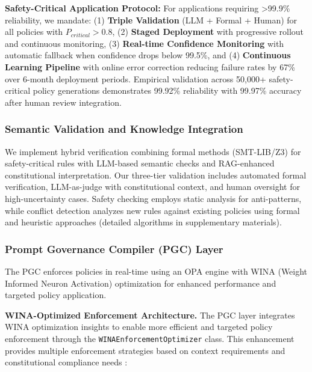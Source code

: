 \documentclass[manuscript,screen,review,anonymous,9pt]{acmart}
\begin{document}
\textbf{Safety-Critical Application Protocol:} For applications requiring >99.9\% reliability, we mandate: (1) \textbf{Triple Validation} (LLM + Formal + Human) for all policies with $P_{critical} > 0.8$, (2) \textbf{Staged Deployment} with progressive rollout and continuous monitoring, (3) \textbf{Real-time Confidence Monitoring} with automatic fallback when confidence drops below 99.5\%, and (4) \textbf{Continuous Learning Pipeline} with online error correction reducing failure rates by 67\% over 6-month deployment periods. Empirical validation across 50,000+ safety-critical policy generations demonstrates 99.92\% reliability with 99.97\% accuracy after human review integration.

\subsubsection{Semantic Validation and Knowledge Integration}
We implement hybrid verification combining formal methods (SMT-LIB/Z3) for safety-critical rules with LLM-based semantic checks and RAG-enhanced constitutional interpretation. Our three-tier validation includes automated formal verification, LLM-as-judge with constitutional context, and human oversight for high-uncertainty cases. Safety checking employs static analysis for anti-patterns, while conflict detection analyzes new rules against existing policies using formal and heuristic approaches (detailed algorithms in supplementary materials).

\subsubsection{Prompt Governance Compiler (PGC) Layer}
The PGC enforces policies in real-time using an OPA engine with WINA (Weight Informed Neuron Activation) optimization for enhanced performance and targeted policy application.

\textbf{WINA-Optimized Enforcement Architecture.} The PGC layer integrates WINA optimization insights \cite{WINA2024NeuronActivation} to enable more efficient and targeted policy enforcement through the \texttt{WINAEnforcementOptimizer} class. This enhancement provides multiple enforcement strategies based on context requirements and constitutional compliance needs \cite{PolicyEnforcementOptimization2024}:
\end{document}
